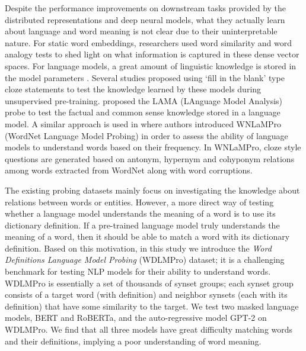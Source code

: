\documentclass[11pt,a4paper]{article}
\begin{document}

Despite the performance improvements on downstream tasks
provided by the distributed representations and deep neural
models, what they actually learn about language and word meaning  is not clear due to their uninterpretable nature. For static word embeddings, researchers used word similarity \cite{hill15simlex} and word analogy \cite{gladkova16analogy} tests to shed light on what information is captured in these dense vector spaces. For language models, a great amount of linguistic knowledge is stored in the model parameters \cite{peters18dissecting}. Several studies proposed using `fill in the blank' type cloze statements to test the knowledge learned by these models during unsupervised pre-training.  proposed the LAMA (LAnguage Model Analysis) probe to test the factual and common sense knowledge stored in a language model. A similar approach is used in \cite{Schick20rareWords} where authors introduced WNLaMPro (WordNet Language Model Probing) in order to assess the ability of language models to understand words based on their frequency. In WNLaMPro, cloze style questions are generated based on antonym, hypernym and cohyponym relations among words extracted from WordNet along with word corruptions.

The existing probing datasets mainly focus on investigating
the knowledge about relations between words or
entities. However, a more direct way of testing whether a
language model understands the meaning of a word is to
use its dictionary definition. If a pre-trained
language model truly understands the meaning of a word, then
it should be able to
match a word with its dictionary definition. 
Based on this motivation, in
this study we introduce the \textit{Word Definitions Language
  Model Probing} (WDLMPro) dataset; it is a challenging
benchmark for testing NLP models for their ability to
understand words.
WDLMPro is essentially a set of
thousands of synset groups; each synset group consists
of a target word (with definition) and neighbor synsets
(each with its definition)
that
have some
similarity to the target.
We test two masked language models, BERT and
RoBERTa, and the auto-regressive model GPT-2 on WDLMPro.
We find
that all three models have great difficulty matching
words and their definitions, implying a poor understanding
of word meaning.

\end{document}
